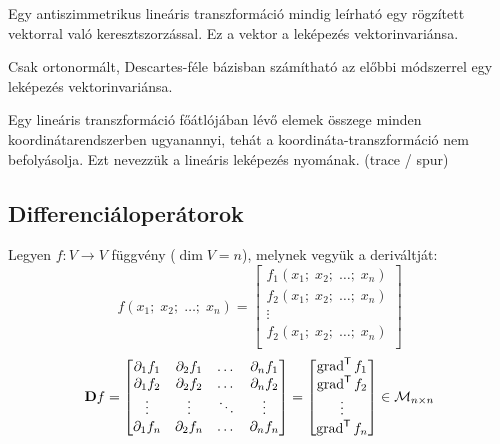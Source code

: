 \documentclass[main.tex]{subfiles}
\begin{document}
Egy antiszimmetrikus lineáris transzformáció
mindig leírható egy rögzített vektorral
való keresztszorzással. Ez a vektor a leképezés
vektorinvariánsa.



Csak ortonormált, Descartes-féle bázisban
számítható az előbbi módszerrel egy leképezés
vektorinvariánsa.



Egy lineáris transzformáció főátlójában lévő
elemek összege minden koordinátarendszerben
ugyanannyi, tehát a koordináta-transzformáció
nem befolyásolja. Ezt nevezzük a lineáris
leképezés nyomának. (trace / spur)

\subsection{Differenciáloperátorok}

Legyen $f: V \rightarrow V$ függvény ($\dim V = n$),
melynek vegyük a deriváltját:
\begin{equation*}
  f \left( x_1; \; x_2; \; \dots ; \; x_n \right)
  =
  \begin{bmatrix}
    f_1 \left( x_1; \; x_2; \; \dots ; \; x_n \right) \\
    f_2 \left( x_1; \; x_2; \; \dots ; \; x_n \right) \\
    \vdots                                            \\
    f_2 \left( x_1; \; x_2; \; \dots ; \; x_n \right) \\
  \end{bmatrix}
\end{equation*}
\begin{equation*}
  \mathbf{D} f
  =
  \begin{bmatrix}
    \partial_1 f_1 & \partial_2 f_1 & \dots  & \partial_n f_1 \\
    \partial_1 f_2 & \partial_2 f_2 & \dots  & \partial_n f_2 \\
    \vdots         & \vdots         & \ddots & \vdots         \\
    \partial_1 f_n & \partial_2 f_n & \dots  & \partial_n f_n
  \end{bmatrix}
  =
  \begin{bmatrix}
    \operatorname{grad}^{\mathsf{T}} f_1 \\
    \operatorname{grad}^{\mathsf{T}} f_2 \\
    \vdots               \\
    \operatorname{grad}^{\mathsf{T}} f_n \\
  \end{bmatrix}
  \in
  \mathcal{M}_{n \times n}
\end{equation*}
\end{document}
